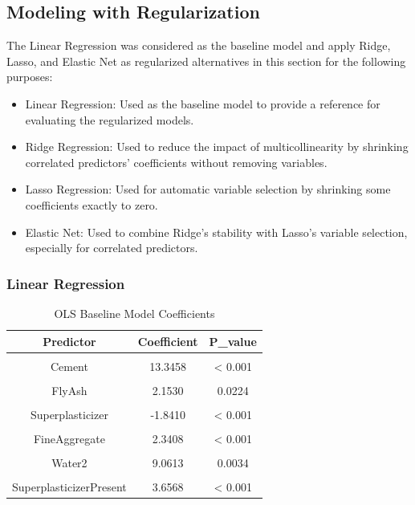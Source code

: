 \documentclass[
  11pt,
]{article}
\begin{document}
\subsection{Modeling with
Regularization}\label{modeling-with-regularization}

The Linear Regression was considered as the baseline model and apply
Ridge, Lasso, and Elastic Net as regularized alternatives in this
section for the following purposes:

\begin{itemize}
\item
  Linear Regression: Used as the baseline model to provide a reference
  for evaluating the regularized models.
\item
  Ridge Regression: Used to reduce the impact of multicollinearity by
  shrinking correlated predictors' coefficients without removing
  variables.
\item
  Lasso Regression: Used for automatic variable selection by shrinking
  some coefficients exactly to zero.
\item
  Elastic Net: Used to combine Ridge's stability with Lasso's variable
  selection, especially for correlated predictors.
\end{itemize}

\subsubsection{Linear Regression}\label{linear-regression}

\begin{table}[!h]
\centering
\caption{\label{tab:linear}OLS Baseline Model Coefficients}
\centering
\fontsize{10}{12}\selectfont
\begin{tabular}[t]{ccc}
\toprule
\textbf{Predictor} & \textbf{Coefficient} & \textbf{P\_value}\\
\midrule
\cellcolor{gray!10}{(Intercept)} & \cellcolor{gray!10}{35.8695} & \cellcolor{gray!10}{< 0.001}\\
Cement & 13.3458 & < 0.001\\
\cellcolor{gray!10}{BlastFurnaceSlag} & \cellcolor{gray!10}{9.1976} & \cellcolor{gray!10}{< 0.001}\\
FlyAsh & 2.1530 & 0.0224\\
\cellcolor{gray!10}{Water} & \cellcolor{gray!10}{-12.3668} & \cellcolor{gray!10}{< 0.001}\\
\addlinespace
Superplasticizer & -1.8410 & < 0.001\\
\cellcolor{gray!10}{CoarseAggregate} & \cellcolor{gray!10}{1.9263} & \cellcolor{gray!10}{< 0.001}\\
FineAggregate & 2.3408 & < 0.001\\
\cellcolor{gray!10}{LogAge} & \cellcolor{gray!10}{10.2485} & \cellcolor{gray!10}{< 0.001}\\
Water2 & 9.0613 & 0.0034\\
\addlinespace
\cellcolor{gray!10}{FlyAshPresent} & \cellcolor{gray!10}{1.7840} & \cellcolor{gray!10}{0.0186}\\
SuperplasticizerPresent & 3.6568 & < 0.001\\
\bottomrule
\end{tabular}
\end{table}
\end{document}
